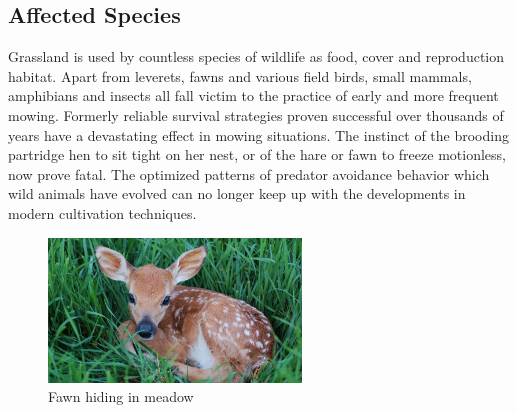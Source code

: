 \subsection{Affected Species} %
\label{sub:affected_species}
Grassland is used by countless species of wildlife as food, cover and reproduction habitat. Apart from leverets, fawns and various field birds, small mammals, amphibians and insects all fall victim to the practice of early and more frequent mowing. Formerly reliable survival strategies proven successful over thousands of years have a devastating effect in mowing situations. The instinct of the brooding partridge hen to sit tight on her nest, or of the hare or fawn to freeze motionless, now prove fatal. The optimized patterns of predator avoidance behavior which wild animals have evolved can no longer keep up with the developments in modern cultivation techniques.
\begin{figure}[ht]
    \centering
    \includegraphics[width=0.6\textwidth]{figures/C1/fawns.jpeg}
    \caption{Fawn hiding in meadow}
    \label{fig:}
\end{figure}



